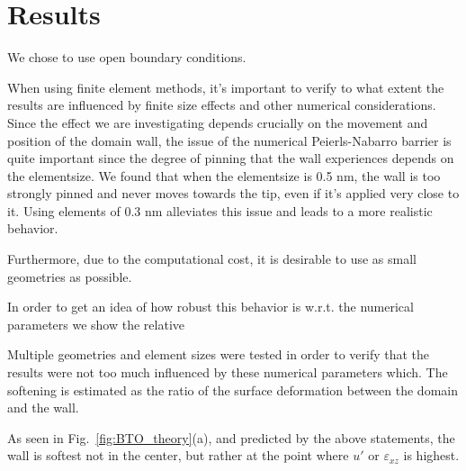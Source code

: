 \section{Results}

We chose to use open boundary conditions.

When using finite element methods, it's important to verify to what extent the results are influenced by finite size effects and other numerical considerations.
Since the effect we are investigating depends crucially on the movement and position of the domain wall, the issue of the numerical Peierls-Nabarro barrier \cite{Marton2018} is quite important since the degree of pinning that the wall experiences depends on the elementsize.
We found that when the elementsize is 0.5 nm, the wall is too strongly pinned and never moves towards the tip, even if it's applied very close to it.
Using elements of 0.3 nm alleviates this issue and leads to a more realistic behavior.


Furthermore, due to the computational cost, it is desirable to use as small geometries as possible.

In order to get an idea of how robust this behavior is w.r.t. the numerical parameters we show the relative 

Multiple geometries and element sizes were tested in order to verify that the results were not too much influenced by these numerical parameters which. 
The softening is estimated as the ratio of the surface deformation between the domain and the wall.

As seen in Fig.~\ref{fig:BTO_theory}(a), and predicted by the above statements, the wall is softest not in the center, but rather at the point where $u'$ or $\varepsilon_{xz}$ is highest.

\printbibliography
